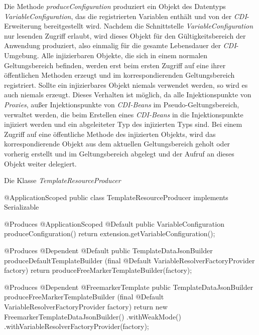 \newline
\newline
Die Methode \emph{produceConfiguration} produziert ein Objekt des Datentyps  \emph{VariableConfiguration}, das die registrierten Variablen enthält und von der \emph{CDI}-Erweiterung bereitgestellt wird. Nachdem die Schnittstelle  \emph{VariableConfiguration} nur lesenden Zugriff erlaubt, wird dieses Objekt für den Gültigkeitsbereich der Anwendung produziert, also einmalig für die gesamte Lebensdauer der \emph{CDI}-Umgebung.
\newline
\newline
Alle injizierbaren Objekte, die sich in einem normalen Geltungsbereich befinden,  werden erst beim ersten Zugriff auf eine ihrer öffentlichen Methoden erzeugt und im korrespondierenden Geltungsbereich registriert. Sollte ein injizierbares Objekt niemals verwendet werden, so wird es auch niemals erzeugt. Dieses Verhalten ist möglich, da alle Injektionspunkte von \emph{Proxies}, außer Injektionspunkte von \emph{CDI-Beans} im Pseudo-Geltungsbereich, verwaltet werden, die beim Erstellen eines \emph{CDI-Beans} in die Injektionspunkte injiziert werden und ein abgeleiteter Typ des injizierten Typs sind. Bei einem Zugriff auf eine öffentliche Methode des injizierten Objekts, wird das korrespondierende Objekt aus dem aktuellen Geltungsbereich geholt oder vorherig erstellt und im Geltungsbereich abgelegt und der Aufruf an dieses Objekt weiter delegiert. 

\begin{program}[h]
\caption{Die Klasse \emph{TemplateResourceProducer}}
\label{prog:templateResourceProducer}
\begin{JavaCode}
@ApplicationScoped
public class TemplateResourceProducer implements Serializable {

    @Produces
    @ApplicationScoped
    @Default
    public VariableConfiguration produceConfiguration() {
        return extension.getVariableConfiguration();
    }
    
    @Produces
    @Dependent
    @Default
    public TemplateDataJsonBuilder produceDefaultTemplateBuilder
          (final @Default VariableResolverFactoryProvider factory) {
        return produceFreeMarkerTemplateBuilder(factory);
    }

    @Produces
    @Dependent
    @FreemarkerTemplate
    public TemplateDataJsonBuilder produceFreeMarkerTemplateBuilder
           (final @Default VariableResolverFactoryProvider factory) {
        return new FreemarkerTemplateDataJsonBuilder()
                      .withWeakMode()
                      .withVariableResolverFactoryProvider(factory);
    }
    
}
\end{JavaCode}
\end{program} 

